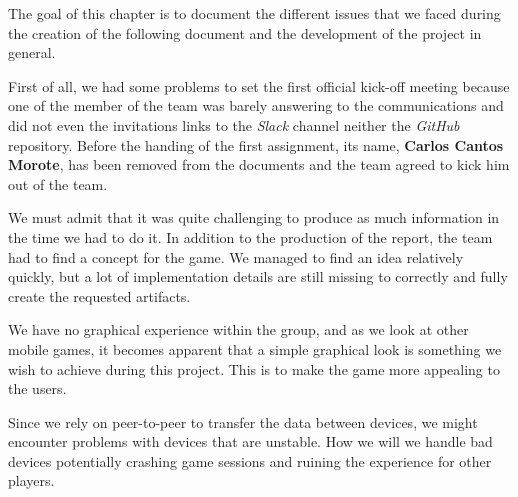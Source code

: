 The goal of this chapter is to document the different issues that we faced during the creation of the following document and the development of the project in general.

First of all, we had some problems to set the first official kick-off meeting because one of the member of the team was barely answering to the communications and did not even the invitations links to the \textit{Slack} channel neither the \textit{GitHub} repository. Before the handing of the first assignment, its name, \textbf{Carlos Cantos Morote}, has been removed from the documents and the team agreed to kick him out of the team.

We must admit that it was quite challenging to produce as much information in the time we had to do it. In addition to the production of the report, the team had to find a concept for the game. We managed to find an idea relatively quickly, but a lot of implementation details are still missing to correctly and fully create the requested artifacts.

We have no graphical experience within the group, and as we look at other mobile games, it becomes apparent that a simple graphical look is something we wish to achieve during this project. This is to make the game more appealing to the users.

Since we rely on peer-to-peer to transfer the data between devices, we might encounter problems with devices that are unstable. How we will we handle bad devices potentially crashing game sessions and ruining the experience for other players.
